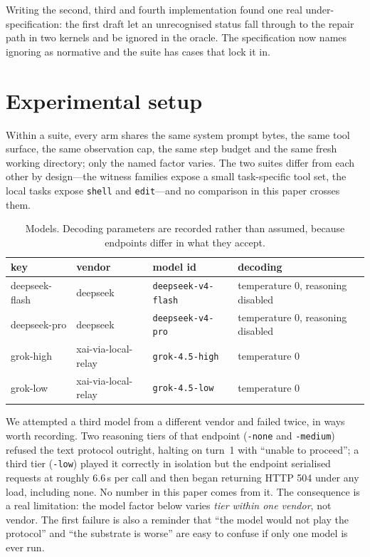 \documentclass[11pt,a4paper]{article}
\begin{document}
Writing the second, third and fourth implementation found one real
under-specification: the first draft let an unrecognised status fall through to
the repair path in two kernels and be ignored in the oracle. The specification
now names ignoring as normative and the suite has cases that lock it in.

\section{Experimental setup}
\label{sec:setup}

Within a suite, every arm shares the same system prompt bytes, the same tool
surface, the same observation cap, the same step budget and the same fresh
working directory; only the named factor varies. The two suites differ from
each other by design---the witness families expose a small task-specific tool
set, the local tasks expose \texttt{shell} and \texttt{edit}---and no
comparison in this paper crosses them.

\begin{table}[h]\centering\small
\caption{Models. Decoding parameters are recorded rather than assumed,
because endpoints differ in what they accept.}
\label{tab:models}
\begin{tabular}{llll}
\toprule
key & vendor & model id & decoding \\
\midrule
deepseek-flash & deepseek & \texttt{deepseek-v4-flash} & temperature 0, reasoning disabled \\
deepseek-pro & deepseek & \texttt{deepseek-v4-pro} & temperature 0, reasoning disabled \\
grok-high & xai-via-local-relay & \texttt{grok-4.5-high} & temperature 0 \\
grok-low & xai-via-local-relay & \texttt{grok-4.5-low} & temperature 0 \\
\bottomrule
\end{tabular}
\end{table}

We attempted a third model from a different vendor and failed twice, in ways
worth recording. Two reasoning tiers of that endpoint (\texttt{-none} and
\texttt{-medium}) refused the text protocol outright, halting on turn~1 with
``unable to proceed''; a third tier (\texttt{-low}) played it correctly in
isolation but the endpoint serialised requests at roughly 6.6\,s per call and
then began returning HTTP 504 under any load, including none. No number in this
paper comes from it. The consequence is a real limitation: the model factor
below varies \emph{tier within one vendor}, not vendor. The first failure is
also a reminder that ``the model would not play the protocol'' and ``the
substrate is worse'' are easy to confuse if only one model is ever run.
\end{document}
